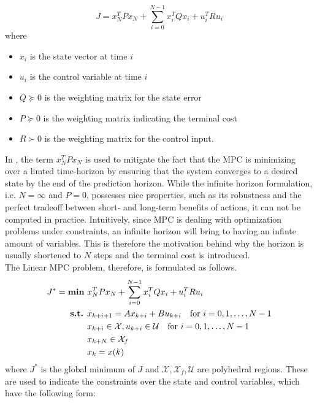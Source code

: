 \begin{equation}
	J = x^T_{N}Px_{N} + \sum_{i=0}^{N-1} x^T_{i}Qx_{i} + u^T_{i}Ru_{i}
	\label{eq:cost_f_2}
\end{equation} 
where
\begin{itemize}
	\item $x_i$ is the state vector at time $i$
	\item $u_i$ is the control variable at time $i$
	\item  $Q \succeq 0$ is the weighting matrix for the state error
	\item  $P \succeq 0$ is the weighting matrix indicating the terminal cost
	\item $R \succ 0$ is the weighting matrix for the control input.
\end{itemize}

In , the term $x^T_{N}Px_{N}$ is used to mitigate the fact that the MPC is minimizing over a limted time-horizon by ensuring that the system converges to a desired state by the end of the prediction horizon. While the infinite horizon formulation, i.e. $N = \infty$ and $P=0$, possesses nice properties, such as its robustness and the perfect tradeoff between short- and long-term benefits of actions, it can not be computed in practice. Intuitively, since MPC is dealing with optimization problems under constraints, an infinite horizon will bring to having an infinte amount of variables. This is therefore the motivation behind why the horizon is usually shortened to $N$ steps and the terminal cost is introduced. \\
The Linear MPC problem, therefore, is formulated as follows. \\
\begin{equation}
	\begin{aligned}
		J^* = \text{\textbf{min} }&x^T_{N}Px_{N} + \sum_{i=0}^{N-1} x^T_{i}Qx_{i} + u^T_{i}Ru_{i}\\
		\text{\textbf{s.t.}	}&x_{k+i+1} = Ax_{k+i} + Bu_{k+i} \quad \text{for } i = 0, 1, \ldots, N-1 \\
		 &x_{k+i} \in \mathcal{X}, u_{k+i} \in \mathcal{U} \quad \text{for } i = 0, 1, \ldots, N-1\\
		 &x_{k+N} \in \mathcal{X}_f\\
		 &x_{k} = x(k)
	\end{aligned}
\end{equation}
where $J^*$ is the global minimum of $J$ and $\mathcal{X}, \mathcal{X}_f,\mathcal{U}$ are polyhedral regions. These are used to indicate the constraints over the state and control variables, which have the following form:

